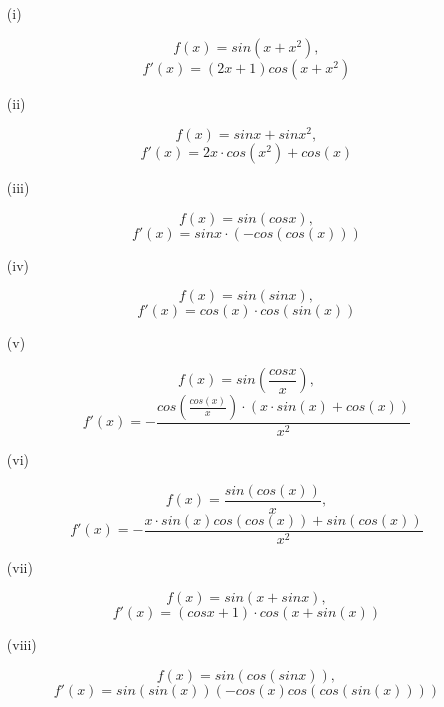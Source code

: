\documentclass[a4paper,12pt]{report}
\begin{document}
\begin{enumerate}
\item[(i)] 
\begin{sloppypar}
\[f(x)=sin(x+x^2),\]\[ f'(x)=(2x+1)cos(x+x^2)\]
\end{sloppypar}
\item[(ii)] 
\begin{sloppypar}
\[f(x)=sinx+sinx^2,\]\[ f'(x)=2x\cdot{cos(x^2)}+cos(x)\]
\end{sloppypar}
\item[(iii)] 
\begin{sloppypar}
\[f(x)=sin(cosx),\]\[ f'(x)=sinx\cdot{(-cos(cos(x)))}\]
\end{sloppypar}
\item[(iv)] 
\begin{sloppypar}
\[f(x)=sin(sinx), \]\[f'(x)=cos(x)\cdot{cos(sin(x))}\]
\end{sloppypar}
\item[(v)] 
\begin{sloppypar}
\[f(x)=sin(\frac{cosx}{x}),\]\[ f'(x)=-\frac{cos(\frac{cos(x)}{x})\cdot{(x\cdot{sin(x)+cos(x)})}}{x^2}\]
\end{sloppypar}
\item[(vi)] 
\begin{sloppypar}
\[f(x)=\frac{sin(cos(x))}{x}, \]\[f'(x)=-\frac{x\cdot{sin(x)cos(cos(x))+sin(cos(x))}}{x^2}\]
\end{sloppypar}
\item[(vii)] 
\begin{sloppypar}
\[f(x)=sin(x+sinx),\]\[ f'(x)=(cosx+1)\cdot{cos(x+sin(x))}\]
\end{sloppypar}
\item[(viii)] 
\begin{sloppypar}
\[f(x)=sin(cos(sinx)),\]\[ f'(x)=sin(sin(x))(-cos(x)cos(cos(sin(x))))\]
\end{sloppypar}
\end{enumerate}
\end{document}
